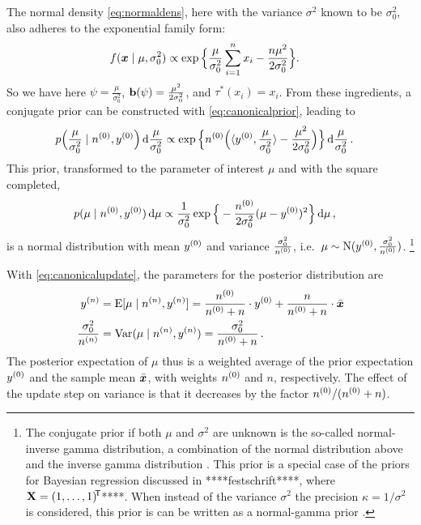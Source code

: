 The normal density \eqref{eq:normaldens}, here with the variance $\sigma^2$ known to be $\sigma^2_0$,
also adheres to the exponential family form:
\begin{align*}
f({\bm x} \mid \mu, \sigma_0^2)
 &\propto \exp\Big\{ \frac{\mu}{\sigma_0^2} \sum_{i=1}^n x_i - \frac{n\mu^2}{2\sigma_0^2} \Big\}.
\end{align*}
So we have here $\psi = \frac{\mu}{\sigma_0^2}$, $\mathbf{b}(\psi) = \frac{\mu^2}{2\sigma_0^2}$, and $\tau^*(x_i) = x_i$.
From these ingredients, a conjugate prior can be constructed with \eqref{eq:canonicalprior}, leading to
\begin{align*}
p\Big(\frac{\mu}{\sigma_0^2} \mid n^{(0)}, y^{(0)}\Big) \,\mathrm{d}\frac{\mu}{\sigma_0^2}
 &\propto \exp\Big\{ n^{(0)} \Big( \langle y^{(0)}, \frac{\mu}{\sigma_0^2} \rangle - \frac{\mu^2}{2\sigma_0^2} \Big) \Big\} \,\mathrm{d}\frac{\mu}{\sigma_0^2}\,.
\end{align*}
This prior, transformed to the parameter of interest $\mu$ and with the square completed,
\begin{align*}
p(\mu \mid n^{(0)}, y^{(0)}) \,\mathrm{d}\mu
 &\propto \frac{1}{\sigma_0^2} \exp\Big\{ -\frac{n^{(0)}}{2\sigma_0^2} (\mu - y^{(0)})^2 \Big\} \,\mathrm{d}\mu\,,
\end{align*}
is a normal distribution with mean $y^{(0)}$ and variance $\frac{\sigma_0^2}{n^{(0)}}$,
i.e.\ $\mu \sim \operatorname{N}(y^{(0)}, \frac{\sigma_0^2}{n^{(0)}})$.%
\footnote{The conjugate prior if both $\mu$ and $\sigma^2$ are unknown
is the so-called normal-inverse gamma distribution,
a combination of the normal distribution above and the inverse gamma distribution
\parencite[see, e.g.,][pp.~119, 431]{2000:bernardosmith}.
This prior is a special case of the priors for Bayesian regression discussed in ****festschrift****,
where $\mathbf{X} = (1, \ldots, 1)^{{\mbox{\!\scriptsize\textsf{T}}}}$****.
When instead of the variance $\sigma^2$ the precision $\kappa = 1/\sigma^2$ is considered,
this prior is can be written as a normal-gamma prior
\parencite[see, e.g.,][pp.~136, 434]{2000:bernardosmith}.}

With \eqref{eq:canonicalupdate}, the parameters for the posterior distribution are
\begin{align}
y^{(n)} &= \operatorname{E}[\mu\mid n^{(n)}, y^{(n)}] = \frac{n^{(0)}}{n^{(0)} + n} \cdot y^{(0)} + \frac{n}{n^{(0)} + n} \cdot \bar{{\bm x}} \label{eq:normalposte}\\
\frac{\sigma_0^2}{n^{(n)}} &= \operatorname{Var}(\mu\mid n^{(n)}, y^{(n)}) = \frac{\sigma_0^2}{n^{(0)} + n}\,. \label{eq:normalpostvar}
\end{align}
The posterior expectation of $\mu$ thus is a weighted average of the prior expectation $y^{(0)}$ and the sample mean $\bar{{\bm x}}$,
with weights $n^{(0)}$ and $n$, respectively.
The effect of the update step on variance is that it decreases by the factor $n^{(0)}/(n^{(0)}+n)$.

